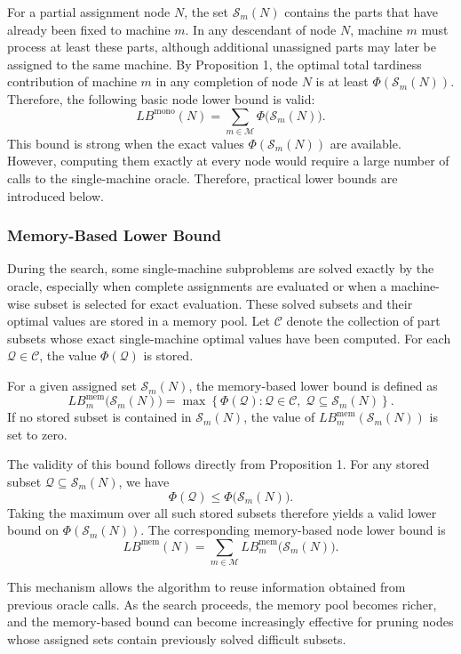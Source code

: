 \documentclass[letterpaper, 10 pt, conference]{ieeeconf}  %
\begin{document}
For a partial assignment node $N$, the set $\mathcal{S}_m(N)$ contains the
parts that have already been fixed to machine $m$. In any descendant of
node $N$, machine $m$ must process at least these parts, although additional
unassigned parts may later be assigned to the same machine. By Proposition
1, the optimal total tardiness contribution of machine $m$ in any completion
of node $N$ is at least $\Phi(\mathcal{S}_m(N))$. Therefore, the following
basic node lower bound is valid:
\[
LB^{\mathrm{mono}}(N)
=
\sum_{m\in\mathcal{M}}
\Phi\bigl(\mathcal{S}_m(N)\bigr).
\]
This bound is strong when the exact values
$\Phi(\mathcal{S}_m(N))$ are available. However, computing them exactly at
every node would require a large number of calls to the single-machine
oracle. Therefore, practical lower bounds are introduced below.

\subsubsection{Memory-Based Lower Bound}

During the search, some single-machine subproblems are solved exactly by
the oracle, especially when complete assignments are evaluated or when a
machine-wise subset is selected for exact evaluation. These solved subsets
and their optimal values are stored in a memory pool. Let $\mathcal{C}$
denote the collection of part subsets whose exact single-machine optimal
values have been computed. For each $\mathcal{Q}\in\mathcal{C}$, the value
$\Phi(\mathcal{Q})$ is stored.

For a given assigned set $\mathcal{S}_m(N)$, the memory-based lower bound is
defined as
\[
LB_m^{\mathrm{mem}}\bigl(\mathcal{S}_m(N)\bigr)
=
\max
\left\{
\Phi(\mathcal{Q}) :
\mathcal{Q}\in\mathcal{C},
\;
\mathcal{Q}\subseteq \mathcal{S}_m(N)
\right\}.
\]
If no stored subset is contained in $\mathcal{S}_m(N)$, the value of
$LB_m^{\mathrm{mem}}(\mathcal{S}_m(N))$ is set to zero.

The validity of this bound follows directly from Proposition 1. For any
stored subset $\mathcal{Q}\subseteq \mathcal{S}_m(N)$, we have
\[
\Phi(\mathcal{Q})
\le
\Phi\bigl(\mathcal{S}_m(N)\bigr).
\]
Taking the maximum over all such stored subsets therefore yields a valid
lower bound on $\Phi(\mathcal{S}_m(N))$. The corresponding memory-based
node lower bound is
\[
LB^{\mathrm{mem}}(N)
=
\sum_{m\in\mathcal{M}}
LB_m^{\mathrm{mem}}\bigl(\mathcal{S}_m(N)\bigr).
\]

This mechanism allows the algorithm to reuse information obtained from
previous oracle calls. As the search proceeds, the memory pool becomes
richer, and the memory-based bound can become increasingly effective for
pruning nodes whose assigned sets contain previously solved difficult
subsets.
\end{document}
